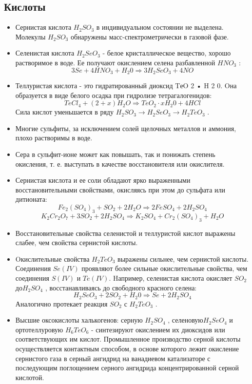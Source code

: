 \documentclass[11pt]{article}
\begin{document}
\subsection{Кислоты}
\begin{itemize}
\item Сернистая кислота $H _2 SO _3$ в индивидуальном состоянии не выделена. Молекулы $H _2 SO _3$
обнаружены масс-спектрометрически в газовой фазе. 
\item Селенистая кислота $H _2 SeO_3$ - белое
кристаллическое вещество, хорошо растворимое в воде. Ее получают окислением селена
разбавленной $HNO _3$ :
$$3Se + 4HNO _3 + H _2 0 \Rightarrow 3H _2 SeO _3 + 4NO$$

\item Теллуристая кислота - это гидратированный диоксид TеO 2 • H 2 0. Oна образуется в виде
белого осадка при гидролизе тетрагалогенидов:
$$TeCl _4 + (2 + x)H _2 O \Rightarrow TeO _2 \cdot xH _2 0 + 4HCl$$
Сила кислот уменьшается в ряду $H _2 SO _3 \rightarrow H _2 SeO _3 \rightarrow H _2 TeO _3$ .

\item Многие сульфиты, за исключением солей щелочных металлов и аммония, плохо
растворимы в воде.
\item Сера в сульфит-ионе может как повышать, так и понижать степень окисления, т. е.
выступать в качестве восстановителя или окислителя.
\item Сернистая кислота и ее соли обладают ярко выраженными восстановительными
свойствами, окисляясь при этом до сульфата или дитионата:
$$Fe _2 (SO _4 ) _3 + SO _2 + 2H _2 O \Rightarrow 2FeSO _4 + 2H _2 SO _4$$
$$K _2 Cr _2 O _7 + 3SO _2 + 2H _2 SO _4 \Rightarrow K _2 SO _4 + Cr _2 (SO _4 ) _3 + H _2 O$$
\item Восстановительные свойства селенистой и теллуристой кислот выражены слабее, чем
свойства сернистой кислоты.

\item Oкислительные свойства $H _2 TeO _3$ выражены сильнее, чем сернистой кислоты. Соединения
$Se(IV)$ проявляют более сильные окислительные свойства, чем соединения $S(IV)$ и $Te(IV)$.
Hапример, селенистая кислота окисляет $SO _2$ до$ H _2 SO _4$ , восстанавливаясь до свободного
красного селена:
$$H _2 SeO _3 + 2SO _2 + H _2 0 \Rightarrow Se + 2H _2 SO _4$$
Аналогично протекает реакция $SO _2$ с $ H _2 TeO _3$ .

\item Высшие оксокислоты халькогенов: серную $H _2 SO _4$ , селеновую$ H _2 SeO _4$ и ортотеллуровую
$H_6 TeO _6$ - синтезируют окислением их диоксидов или соответствующих им кислот.
Промышленное производство серной кислоты осуществляется контактным способом, в
основе которого лежит окисление сернистого газа в серный ангидрид на ванадиевом
катализаторе с последующим поглощением серного ангидрида концентрированной
серной кислотой.


\end{itemize}
\end{document}
